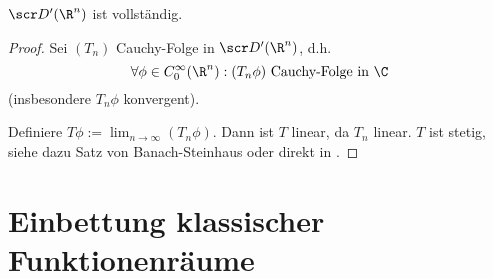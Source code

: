 \begin{st} \label{5.6}
	$\scr D'(\R^n)$ ist vollständig.
	\begin{proof}
		Sei $(T_n)$ Cauchy-Folge in $\scr D'(\R^n)$, d.h.
		\[
			\forall \phi \in C_0^\infty(\R^n) : (T_n \phi) \text{ Cauchy-Folge in $\C$}
		\]
		(insbesondere $T_n \phi$ konvergent).

		Definiere $T\phi := \lim_{n\to \infty} (T_n \phi)$.
		Dann ist $T$ linear, da $T_n$ linear.
		$T$ ist stetig, siehe dazu Satz von Banach-Steinhaus oder direkt in \cite{Walter}.
	\end{proof}
\end{st}

\section{Einbettung klassischer Funktionenräume}


